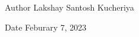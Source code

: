\begin{DoxyAuthor}{Author}
Lakshay Santosh Kucheriya 
\end{DoxyAuthor}
\begin{DoxyDate}{Date}
Feburary 7, 2023 
\end{DoxyDate}
